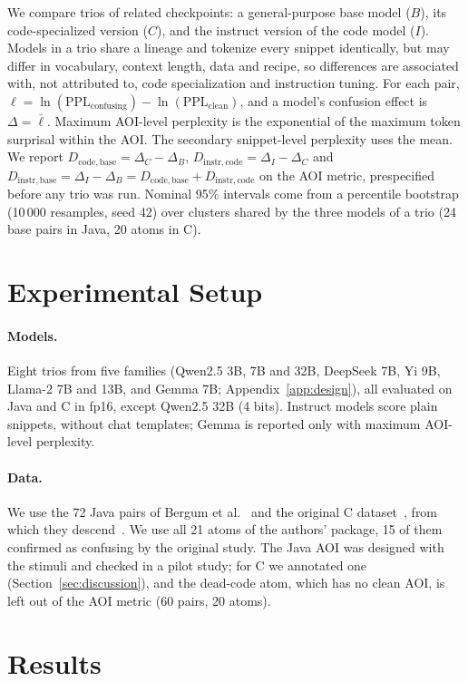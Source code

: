 \documentclass[sigconf,nonacm]{acmart}
\newcommand{\Dcb}{D_{\mathrm{code},\mathrm{base}}}
\newcommand{\Dic}{D_{\mathrm{instr},\mathrm{code}}}
\newcommand{\Dib}{D_{\mathrm{instr},\mathrm{base}}}
\begin{document}
We compare trios of related checkpoints: a general-purpose base model ($B$), its code-specialized version ($C$), and the instruct version of the code model ($I$).
Models in a trio share a lineage and tokenize every snippet identically, but may differ in vocabulary, context length, data and recipe, so differences are associated with, not attributed to, code specialization and instruction tuning.
For each pair, $\ell = \ln(\mathrm{PPL}_{\mathrm{confusing}}) - \ln(\mathrm{PPL}_{\mathrm{clean}})$, and a model's confusion effect is $\Delta = \bar{\ell}$.
Maximum AOI-level perplexity is the exponential of the maximum token surprisal within the AOI. The secondary snippet-level perplexity uses the mean.
We report $\Dcb = \Delta_C - \Delta_B$, $\Dic = \Delta_I - \Delta_C$ and $\Dib = \Delta_I - \Delta_B = \Dcb + \Dic$ on the AOI metric, prespecified before any trio was run.
Nominal 95\% intervals come from a percentile bootstrap (10\,000 resamples, seed 42) over clusters shared by the three models of a trio (24 base pairs in Java, 20 atoms in C).


\section{Experimental Setup}
\paragraph{Models.}
Eight trios from five families (Qwen2.5 3B, 7B and 32B, DeepSeek 7B, Yi 9B, Llama-2 7B and 13B, and Gemma 7B; Appendix~\ref{app:design}), all evaluated on Java and C in fp16, except Qwen2.5 32B (4 bits).
Instruct models score plain snippets, without chat templates; Gemma is reported only with maximum AOI-level perplexity.

\paragraph{Data.}
We use the 72 Java pairs of Bergum et al.~\cite{bergum2025} and the original C dataset~\cite{gopstein2017}, from which they descend~\cite{langhout2021}.
We use all 21 atoms of the authors' package, 15 of them confirmed as confusing by the original study.
The Java AOI was designed with the stimuli and checked in a pilot study; for C we annotated one (Section~\ref{sec:discussion}), and the dead-code atom, which has no clean AOI, is left out of the AOI metric (60 pairs, 20 atoms).

\section{Results}
\end{document}
